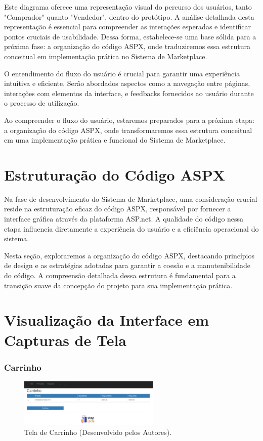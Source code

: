 \documentclass[
	12pt,				%
	openright,			%
	twoside,			%
	a4paper,			%
	english,			%
	brazil				%
	]{abntex2}
\begin{document}
Este diagrama oferece uma representação visual do percurso dos usuários, tanto "Comprador" quanto "Vendedor", dentro do protótipo. A análise detalhada desta representação é essencial para compreender as interações esperadas e identificar pontos cruciais de usabilidade. Dessa forma, estabelece-se uma base sólida para a próxima fase: a organização do código ASPX, onde traduziremos essa estrutura conceitual em implementação prática no Sistema de Marketplace.

O entendimento do fluxo do usuário é crucial para garantir uma experiência intuitiva e eficiente. Serão abordados aspectos como a navegação entre páginas, interações com elementos da interface, e feedbacks fornecidos ao usuário durante o processo de utilização.

Ao compreender o fluxo do usuário, estaremos preparados para a próxima etapa: a organização do código ASPX, onde transformaremos essa estrutura conceitual em uma implementação prática e funcional do Sistema de Marketplace.

\section{Estruturação do Código ASPX}

Na fase de desenvolvimento do Sistema de Marketplace, uma consideração crucial reside na estruturação eficaz do código ASPX, responsável por fornecer a interface gráfica através da plataforma ASP.net. A qualidade do código nessa etapa influencia diretamente a experiência do usuário e a eficiência operacional do sistema.

Nesta seção, exploraremos a organização do código ASPX, destacando princípios de design e as estratégias adotadas para garantir a coesão e a manutenibilidade do código. A compreensão detalhada dessa estrutura é fundamental para a transição suave da concepção do projeto para sua implementação prática.

\section{Visualização da Interface em Capturas de Tela}

\subsubsection{Carrinho}

\begin{figure}[htb]
    \centering
    \includegraphics[width=0.6\textwidth]{img/carrinho-desktop-print.jpg}
    \caption{Tela de Carrinho (Desenvolvido pelos Autores).}
    \label{fig:tela-de-carrinho-desktop}
\end{figure}
\end{document}
